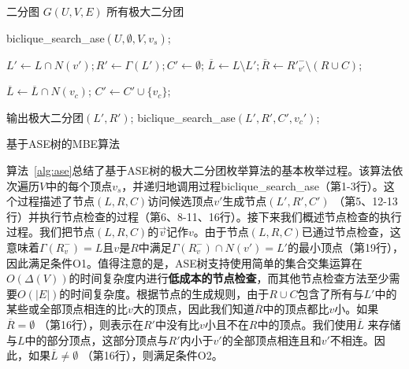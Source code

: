 \begin{algorithm}[H]
  \begin{algorithmic}[1]
      \normalsize
      \REQUIRE 二分图 $G(U,V,E)$
      \ENSURE 所有极大二分团
      
      \renewcommand{\algorithmicdo}{\textbf{do}}
        \STATE \textsf{biclique\_search\_ase}$(U,\emptyset,V,v_s)$;
      \ENDFOR

      \renewcommand{\algorithmicwhile}{\textbf{procedure}}
      \renewcommand{\algorithmicdo}{\textbf{:}}
      \renewcommand{\algorithmicdo}{\textbf{do}}
      \STATE $L' \leftarrow L \cap N(v'); R' \leftarrow \Gamma(L'); C' \leftarrow \emptyset$;
      \STATE $\overline{L}\leftarrow L \setminus L'; \overline{R}\leftarrow {R'}_{v'}^- \setminus (R \cup C)$;

              \STATE $\overline{L} \leftarrow \overline{L} \cap N(v_c)$; 
            \ENDIF
            \STATE $C' \leftarrow C' \cup \{v_c\}$;
          \ENDIF
        \ENDFOR

          \STATE 输出极大二分团$(L', R')$;
              \STATE \textsf{biclique\_search\_ase}$(L', R', C', v_c')$;
            \ENDIF
          \ENDFOR
        \ENDIF
      \ENDWHILE

  \end{algorithmic}
  \caption{基于ASE树的MBE算法}
  \label{alg:ase}
\end{algorithm}



算法~\ref{alg:ase}总结了基于ASE树的极大二分团枚举算法的基本枚举过程。该算法依次遍历$V$中的每个顶点$v_s$，并递归地调用过程\textsf{biclique\_search\_ase}（第1-3行）。这个过程描述了节点$(L,R,C)$访问候选顶点$v'$生成节点$(L',R',C')$ （第5、12-13行）并执行节点检查的过程（第6、8-11、16行）。接下来我们概述节点检查的执行过程。我们把节点$(L,R,C)$的$\vec{v}$记作$v$。由于节点$(L,R,C)$已通过节点检查，这意味着$\Gamma(R_v^-) = L$且$v$是$R$中满足$\Gamma(R_v^-) \cap N(v') = L'$的最小顶点（第19行），因此满足条件O1。值得注意的是，ASE树支持使用简单的集合交集运算在$O(\Delta(V))$的时间复杂度内进行\textbf{低成本的节点检查}，而其他节点检查方法至少需要$O(|E|)$的时间复杂度。根据节点的生成规则，由于$R \cup C$包含了所有与$L'$中的某些或全部顶点相连的比$v$大的顶点，因此我们知道$\overline{R}$中的顶点都比$v$小。如果$\overline{R} = \emptyset$ （第16行），则表示在$R'$中没有比$v$小且不在$R$中的顶点。我们使用$\overline{L}$ 来存储与$L$中的部分顶点，这部分顶点与$R'$内小于$v'$的全部顶点相连且和$v'$不相连。因此，如果$\overline{L} \neq \emptyset$ （第16行），则满足条件O2。

